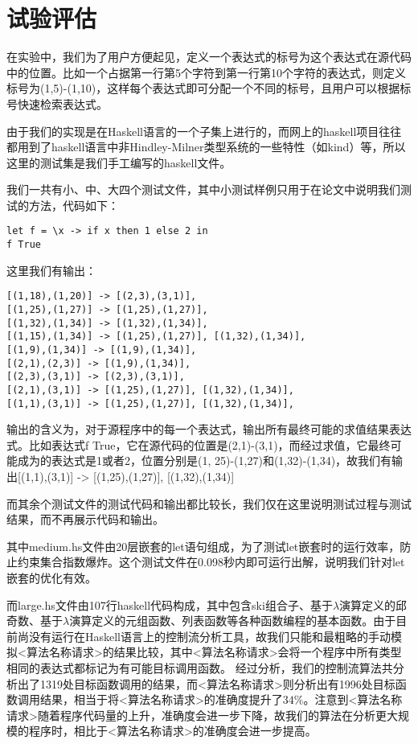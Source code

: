 \documentclass[UTF8, colorlinks]{pkuthss}
\begin{document}
	\chapter{试验评估}
	在实验中，我们为了用户方便起见，定义一个表达式的标号为这个表达式在源代码中的位置。比如一个占据第一行第5个字符到第一行第10个字符的表达式，则定义标号为(1,5)-(1,10)，这样每个表达式即可分配一个不同的标号，且用户可以根据标号快速检索表达式。
	
	由于我们的实现是在Haskell语言的一个子集上进行的，而网上的haskell项目往往都用到了haskell语言中非Hindley-Milner类型系统的一些特性（如kind）等，所以这里的测试集是我们手工编写的haskell文件。
	
	我们一共有小、中、大四个测试文件，其中小测试样例只用于在论文中说明我们测试的方法，代码如下：
	\begin{lstlisting}
let f = \x -> if x then 1 else 2 in
f True
	\end{lstlisting}
	这里我们有输出：
	\begin{lstlisting}
[(1,18),(1,20)] -> [(2,3),(3,1)],
[(1,25),(1,27)] -> [(1,25),(1,27)],
[(1,32),(1,34)] -> [(1,32),(1,34)],
[(1,15),(1,34)] -> [(1,25),(1,27)], [(1,32),(1,34)],
[(1,9),(1,34)] -> [(1,9),(1,34)],
[(2,1),(2,3)] -> [(1,9),(1,34)],
[(2,3),(3,1)] -> [(2,3),(3,1)],
[(2,1),(3,1)] -> [(1,25),(1,27)], [(1,32),(1,34)],
[(1,1),(3,1)] -> [(1,25),(1,27)], [(1,32),(1,34)],
	\end{lstlisting}
	输出的含义为，对于源程序中的每一个表达式，输出所有最终可能的求值结果表达式。比如表达式f True，它在源代码的位置是(2,1)-(3,1)，而经过求值，它最终可能成为的表达式是1或者2，位置分别是(1, 25)-(1,27)和(1,32)-(1,34)，故我们有输出[(1,1),(3,1)] -> [(1,25),(1,27)], [(1,32),(1,34)]
	
	而其余个测试文件的测试代码和输出都比较长，我们仅在这里说明测试过程与测试结果，而不再展示代码和输出。
	
	其中medium.hs文件由20层嵌套的let语句组成，为了测试let嵌套时的运行效率，防止约束集合指数爆炸。这个测试文件在0.098秒内即可运行出解，说明我们针对let嵌套的优化有效。
	
	而large.hs文件由107行haskell代码构成，其中包含ski组合子、基于$\lambda$演算定义的邱奇数、基于$\lambda$演算定义的元组函数、列表函数等各种函数编程的基本函数。由于目前尚没有运行在Haskell语言上的控制流分析工具，故我们只能和最粗略的手动模拟<算法名称请求>的结果比较，其中<算法名称请求>会将一个程序中所有类型相同的表达式都标记为有可能目标调用函数。 经过分析，我们的控制流算法共分析出了1319处目标函数调用的结果，而<算法名称请求>则分析出有1996处目标函数调用结果，相当于将<算法名称请求>的准确度提升了$34\%$。注意到<算法名称请求>随着程序代码量的上升，准确度会进一步下降，故我们的算法在分析更大规模的程序时，相比于<算法名称请求>的准确度会进一步提高。
	
\end{document}
